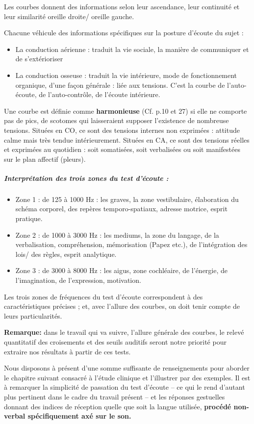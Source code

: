 Les courbes donnent des informations selon leur ascendance, leur
continuité et leur similarité oreille droite/ oreille gauche.

Chacune  véhicule des informations spécifiques
sur la posture d'écoute du sujet :
\begin{itemize}
\item La conduction aérienne : traduit la vie sociale, la manière de communiquer
et de s'extérioriser
\item La conduction osseuse : traduit la vie intérieure, mode de fonctionnement
organique, d'une façon générale : liée aux tensions. C'est la courbe
de l\textquoteright auto-écoute, de l\textquoteright auto-contrôle,
de l'écoute intérieure.
\end{itemize}

Une courbe est définie comme \textbf{harmonieuse} (Cf. p.10 et 27) si elle ne comporte pas de
pics, de scotomes
qui laisseraient
supposer l'existence de nombreuse tensions.
Situées en CO, ce sont des tensions internes non exprimées : attitude
calme mais très tendue intérieurement.
Situées en CA, ce sont des tensions réelles et exprimées au quotidien
: soit somatisées, soit verbalisées ou soit manifestées sur le plan
affectif (pleurs).

\subparagraph{Interprétation des trois zones du test d'écoute : }
\begin{itemize}
\item Zone 1 : de 125 à 1000 Hz : les graves, la zone vestibulaire, élaboration
du schéma corporel, des repères temporo-spatiaux, adresse motrice,
esprit pratique.
\item Zone 2 : de 1000 à 3000 Hz : les mediums, la zone du langage, de la
  verbalisation, compréhension,%
 mémorisation (Papez etc.), de l'intégration des lois/
 des règles, esprit analytique.
\item Zone 3 : de 3000 à 8000 Hz : les aigus, zone cochléaire, de l'énergie,
  de l'imagination, de l'expression, motivation.
\end{itemize}

Les trois zones de fréquences du test d'écoute correspondent à des
caractéristiques précises ; et, avec l'allure des courbes, on doit
tenir compte de leurs particularités.


\textbf{Remarque:} dans le travail qui va suivre, l'allure générale des courbes, le relevé quantitatif des
  croisements et des seuils auditifs seront notre priorité pour
  extraire nos résultats à partir de ces tests.

Nous disposons à présent d'une somme suffisante de renseignements pour
aborder le chapitre suivant consacré à l'étude clinique et
l'illustrer par des exemples.
Il est à remarquer la simplicité de
passation du test d'écoute -- ce qui le rend d'autant
plus pertinent dans le cadre du travail présent -- et les réponses gestuelles
 donnant des indices de réception %
quelle que soit la langue utilisée,\textbf{ procédé non-verbal
spécifiquement axé sur le son.}
